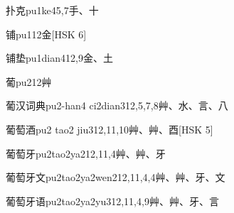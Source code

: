\begin{EntryWithPhonetic}{扑克}{pu1ke4}{5,7}{⼿、⼗}
\end{EntryWithPhonetic}

\begin{EntryWithPhonetic}{铺}{pu1}{12}{⾦}[HSK 6]
\end{EntryWithPhonetic}

\begin{EntryWithPhonetic}{铺垫}{pu1dian4}{12,9}{⾦、⼟}
\end{EntryWithPhonetic}

\begin{EntryWithPhonetic}{葡}{pu2}{12}{⾋}
\end{EntryWithPhonetic}

\begin{EntryWithPhonetic}{葡汉词典}{pu2-han4 ci2dian3}{12,5,7,8}{⾋、⽔、⾔、⼋}
\end{EntryWithPhonetic}

\begin{EntryWithPhonetic}{葡萄酒}{pu2 tao2 jiu3}{12,11,10}{⾋、⾋、⾣}[HSK 5]
\end{EntryWithPhonetic}

\begin{EntryWithPhonetic}{葡萄牙}{pu2tao2ya2}{12,11,4}{⾋、⾋、⽛}
\end{EntryWithPhonetic}

\begin{EntryWithPhonetic}{葡萄牙文}{pu2tao2ya2wen2}{12,11,4,4}{⾋、⾋、⽛、⽂}
\end{EntryWithPhonetic}

\begin{EntryWithPhonetic}{葡萄牙语}{pu2tao2ya2yu3}{12,11,4,9}{⾋、⾋、⽛、⾔}
\end{EntryWithPhonetic}

